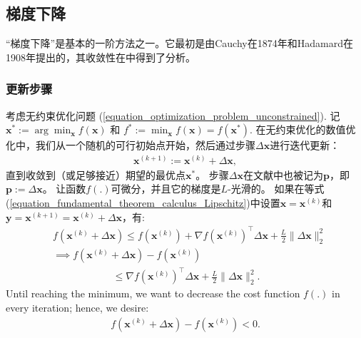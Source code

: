 \documentclass[lang=cn,10pt]{gorgeousnbook}
\numberwithin{equation}{section}%
\numberwithin{figure}{section}%
\begin{document}
\subsection{梯度下降}\label{section_gradient_descent}
“梯度下降”是基本的一阶方法之一。它最初是由Cauchy在1874年\cite{lemarechal2012cauchy}和Hadamard在1908年\cite{hadamard1908memoire}提出的，其收敛性在\cite{curry1944method}中得到了分析。
\subsubsection{更新步骤}\label{section_GD_step_update}

考虑无约束优化问题 (\ref{equation_optimization_problem_unconstrained}).
记 $\boldsymbol{x}^* := \arg \min_{\boldsymbol{x}} f(\boldsymbol{x})$ 和 $f^* := \min_{\boldsymbol{x}} f(\boldsymbol{x}) = f(\boldsymbol{x}^*)$.
在无约束优化的数值优化中，我们从一个随机的可行初始点开始，然后通过步骤$\Delta \boldsymbol{x}$进行迭代更新：
\begin{align}\label{equation_update_point_numerical_optimization}
\boldsymbol{x}^{(k+1)} := \boldsymbol{x}^{(k)} + \Delta \boldsymbol{x},
\end{align}
直到收敛到（或足够接近）期望的最优点$\boldsymbol{x}^*$。
步骤$\Delta\boldsymbol{x}$在文献中也被记为$\boldsymbol{p}$，即$\boldsymbol{p} := \Delta\boldsymbol{x}$。
让函数$f(.)$可微分，并且它的梯度是$L$-光滑的。
如果在等式(\ref{equation_fundamental_theorem_calculus_Lipschitz})中设置$\boldsymbol{x} = \boldsymbol{x}^{(k)}$和$\boldsymbol{y} = \boldsymbol{x}^{(k+1)} = \boldsymbol{x}^{(k)} + \Delta \boldsymbol{x}$，有:
\begin{align}
&f(\boldsymbol{x}^{(k)} + \Delta \boldsymbol{x}) \leq f(\boldsymbol{x}^{(k)}) + \nabla f(\boldsymbol{x}^{(k)})^\top \Delta \boldsymbol{x} + \frac{L}{2} \|\Delta \boldsymbol{x}\|_2^2 \nonumber\\
&\implies f(\boldsymbol{x}^{(k)} + \Delta \boldsymbol{x}) - f(\boldsymbol{x}^{(k)}) \nonumber\\
&~~~~~~~~~~~~~~~~~~~~~~~~~~~\leq \nabla f(\boldsymbol{x}^{(k)})^\top \Delta \boldsymbol{x} + \frac{L}{2} \|\Delta \boldsymbol{x}\|_2^2. \label{equation_fundamental_theorem_calculus_Lipschitz_GD}
\end{align}
Until reaching the minimum, we want to decrease the cost function $f(.)$ in every iteration; hence, we desire:
\begin{align}\label{equation_GD_decrease_cost_function}
f(\boldsymbol{x}^{(k)} + \Delta \boldsymbol{x}) - f(\boldsymbol{x}^{(k)}) < 0.
\end{align}
\end{document}
